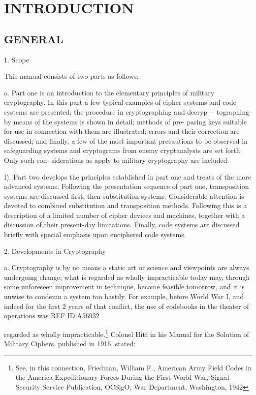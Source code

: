 
\chapter{INTRODUCTION}
 
\section{GENERAL}

1. Scope

This manual consists of two parts as follows:

a. Part one is an introduction to the elementary principles of military
cryptography. In this part a few typical examples of cipher systems and
code systems are presented; the procedure in cryptographing and decryp—
tographing by means of the systems is shown in detail; methods of pre-
paring keys suitable for use in connection with them are illustrated;
errors and their correction are discussed; and ﬁnally, a few of the most
important precautions to be observed in safeguarding systems and
cryptograms from enemy cryptanalysts are set forth. Only such con-
siderations as apply to military cryptography are included.

I). Part two develops the principles established in part one and treats
of the more advanced systems. Following the presentation sequence of
part one, transposition systems are discussed ﬁrst, then substitution
systems. Considerable attention is devoted to combined substitution and
transposition methods. Following this is a description of a limited number
of cipher devices and machines, together with a discussion of their
present-day limitations. Finally, code systems are discussed brieﬂy with
special emphasis upon enciphered code systems.

2. Developments in Cryptography

a. Cryptography is by no means a static art or science and viewpoints
are always undergoing change; what is regarded as wholly impracticable
today may, through some unforeseen improvement in technique, become
feasible tomorrow, and it is unwise to condemn a system too hastily.
For example, before World War I, and indeed for the ﬁrst 2 years of
that conﬂict, the use of codebooks in the theater of operations was
REF ID:A56932

regarded as wholly impracticable.\footnote{See, in this connection, Friedman, William F., American Army Field Codes in the America Expeditionary Forces During the First World War, Signal Security Service Publication, OCSigO, War Department, Washington, 1942} Colonel Hitt in his Manual for the Solution of Military Ciphers, published in 1916, stated:

